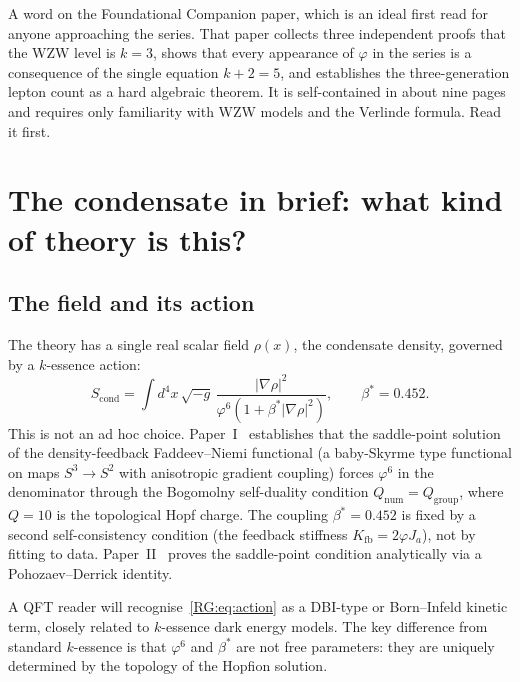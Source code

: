 \documentclass[11pt,a4paper]{article}
\newcommand{\vp}{\varphi}
\newcommand{\bst}{\beta^*}
\begin{document}
A word on the Foundational Companion paper, which is an ideal first read for
anyone approaching the series. That paper collects three independent proofs that
the WZW level is $k=3$, shows that every appearance of $\vp$ in the series is a
consequence of the single equation $k+2=5$, and establishes the three-generation
lepton count as a hard algebraic theorem. It is self-contained in about nine pages
and requires only familiarity with WZW models and the Verlinde formula. Read it
first.

\section{The condensate in brief: what kind of theory is this?}

\subsection{The field and its action}

The theory has a single real scalar field $\rho(x)$, the condensate density, governed
by a $k$-essence action:
\begin{equation}
  S_{\mathrm{cond}} = \int d^4x\,\sqrt{-g}\,\frac{|\nabla\rho|^2}{\vp^6(1+\bst|\nabla\rho|^2)},
  \qquad \bst = 0.452.
  \label{RG:eq:action}
\end{equation}
This is not an ad hoc choice. Paper~I~\cite{Paper1} establishes that the saddle-point solution of
the density-feedback Faddeev--Niemi functional (a baby-Skyrme type functional on
maps $S^3\to S^2$ with anisotropic gradient coupling) forces $\vp^6$ in the
denominator through the Bogomolny self-duality condition $Q_{\mathrm{num}}=Q_{\mathrm{group}}$,
where $Q=10$ is the topological Hopf charge. The coupling $\bst=0.452$ is fixed
by a second self-consistency condition (the feedback stiffness $K_{\mathrm{fb}} = 2\vp J_a$),
not by fitting to data. Paper~II~\cite{Paper2} proves the saddle-point condition analytically via a Pohozaev--Derrick identity.

A QFT reader will recognise~\eqref{RG:eq:action} as a DBI-type or Born--Infeld kinetic
term, closely related to $k$-essence dark energy models. The key difference from
standard $k$-essence is that $\vp^6$ and $\bst$ are not free parameters: they are
uniquely determined by the topology of the Hopfion solution.
\end{document}
